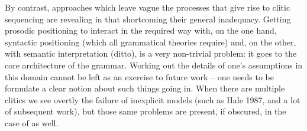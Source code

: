 \documentclass[output=paper,
modfonts
]{LSP/langsci}
\begin{document}
By contrast, approaches which leave vague the processes that give rise to clitic sequencing are revealing
in that shortcoming their general inadequacy. Getting prosodic positioning to interact in the required way with, on the one hand,
syntactic positioning (which all grammatical theories require) and, on the other, with semantic interpretation (ditto), is a very
non-trivial problem: it goes to the core architecture of the grammar. Working out the details of one's assumptions
in this domain cannot be left as an exercise to future work -- one needs to be formulate a clear notion about such
things going in. When there are multiple clitics we see overtly
the failure of inexplicit models (such as Hale 1987, and a lot of subsequent work), but those same problems are present,
if obscured, in the case of  as well.  


\printbibliography[heading=subbibliography,notkeyword=this]

\end{document}
